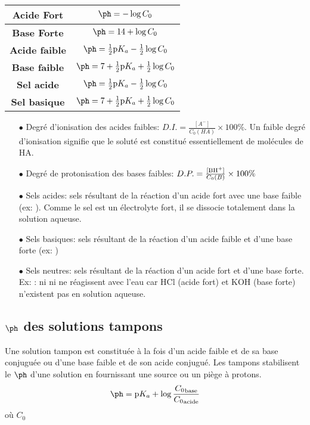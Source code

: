 \begin{center}
  \renewcommand{\arraystretch}{1.5}
  \begin{tabular}{|>{\bf}c|c|}
    \hline
    Acide Fort & $\ph=-\log{C_0}$ \\
    \hline
    Base Forte & $\ph=14+\log{C_0}$ \\
    \hline
    Acide faible & $\ph=\frac{1}{2}\pka-\frac{1}{2}\log{C_0}$ \\
    \hline
    Base faible & $\ph=7+\frac{1}{2}\pka+\frac{1}{2}\log{C_0}$ \\
    \hline
    Sel acide & $\ph=\frac{1}{2}\pka-\frac{1}{2}\log{C_0}$ \\
    \hline
    Sel basique & $\ph=7+\frac{1}{2}\pka+\frac{1}{2}\log{C_0}$ \\
    \hline
  \end{tabular}
\end{center}

\begin{itemize}
  \item[$\bullet$] Degré d'ionisation des acides faibles: $D.I.=\frac{[A^{-}]}{C_0(HA)}\times 100\%$.
    Un faible degré d'ionisation signifie que le soluté est constitué essentiellement de molécules de HA.

  \item[$\bullet$] Degré de protonisation des bases faibles: $D.P.=\frac{[\ce{BH+}]}{C_0(B)}\times 100\%$

  \item[$\bullet$] Sels acides: sels résultant de la réaction d'un acide fort avec une base faible (ex: ).
    Comme le sel est un électrolyte fort,
    il se dissocie totalement dans la solution aqueuse.

  \item[$\bullet$] Sels basiques: sels résultant de la réaction d'un acide faible et d'une base forte (ex: )

  \item[$\bullet$] Sels neutres: sels résultant de la réaction d'un acide fort et d'une base forte.
    Ex: : ni  ni  ne réagissent avec l'eau car HCl (acide fort) et KOH (base forte) n'existent pas en solution aqueuse.
\end{itemize}

\subsection{$\ph$ des solutions tampons}
Une solution tampon est constituée à la fois d'un acide faible et de sa base conjuguée ou d'une base faible et de son acide conjugué.
Les tampons stabilisent le $\ph$ d'une solution en fournissant une source ou un piège à protons.
$$\ph = \pka + \log{\frac{{C_0}_\mathrm{base}}{{C_0}_\mathrm{acide}}}$$
où $C_0$

